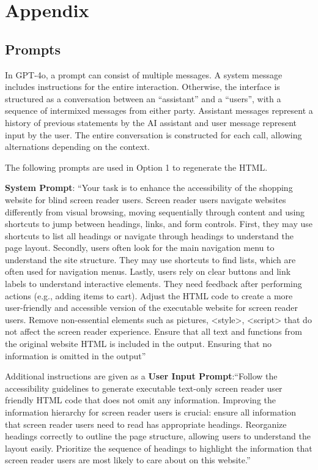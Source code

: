 \section{Appendix}

\subsection{Prompts}
\label{sec:prompt}
In GPT-4o, a prompt can consist of multiple messages. A system message includes instructions for the entire interaction. Otherwise, the interface is structured as a conversation between an ``assistant'' and a ``users'', with a sequence of intermixed messages from either party. Assistant messages represent a history of previous statements by the AI assistant and user message represent input by the user. The entire conversation is constructed for each call, allowing alternations depending on the context.

The following prompts are used in Option 1 to regenerate the HTML.

\textbf{System Prompt}: ``Your task is to enhance the accessibility of the shopping website for blind screen reader users. Screen reader users navigate websites differently from visual browsing, moving sequentially through content and using shortcuts to jump between headings, links, and form controls. First, they may use shortcuts to list all headings or navigate through headings to understand the page layout. Secondly, users often look for the main navigation menu to understand the site structure. They may use shortcuts to find lists, which are often used for navigation menus. Lastly, users rely on clear buttons and link labels to understand interactive elements. They need feedback after performing actions (e.g., adding items to cart). Adjust the HTML code to create a more user-friendly and accessible version of the executable website for screen reader users. Remove non-essential elements such as pictures, <style>, <script> that do not affect the screen reader experience. Ensure that all text and functions from the original website HTML is included in the output. Ensuring that no information is omitted in the output''

Additional instructions are given as a \textbf{User Input Prompt}:``Follow the accessibility guidelines to generate executable text-only screen reader user friendly HTML code that does not omit any information. Improving the information hierarchy for screen reader users is crucial: ensure all information that screen reader users need to read has appropriate headings. Reorganize headings correctly to outline the page structure, allowing users to understand the layout easily. Prioritize the sequence of headings to highlight the information that screen reader users are most likely to care about on this website.''

